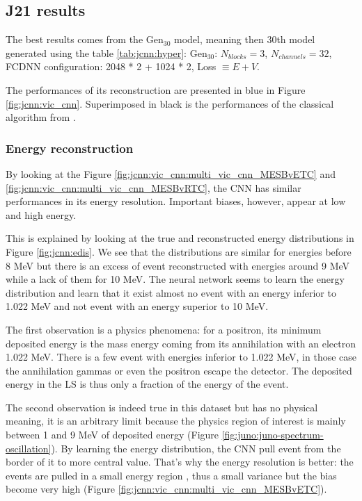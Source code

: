 \documentclass[../main.tex]{subfiles}
\begin{document}
{{\subsection{J21 results}

The best results comes from the $\mathrm{Gen}_{30}$ model, meaning then 30th model generated using the table \ref{tab:jcnn:hyper}: $\mathrm{Gen}_{30}$: $N_{blocks} = 3$, $N_{channels} = 32$, FCDNN configuration: 2048 * 2 + 1024 * 2, Loss $\equiv E+V$.

The performances of its reconstruction are presented in blue in Figure \ref{fig:jcnn:vic_cnn}. Superimposed in black is the performances of the classical algorithm from \cite{lebrin_towards_2022}.

\subsubsection{Energy reconstruction}

By looking at the Figure \ref{fig:jcnn:vic_cnn:multi_vic_cnn_MESBvETC} and \ref{fig:jcnn:vic_cnn:multi_vic_cnn_MESBvRTC}, the CNN has similar performances in its energy resolution. Important biases, however, appear at low and high energy.

This is explained by looking at the true and reconstructed energy distributions in Figure \ref{fig:jcnn:edis}. We see that the distributions are similar for energies before 8 MeV but there is an excess of event reconstructed with energies around 9 MeV while a lack of them for 10 MeV. The neural network seems to learn the energy distribution and learn that it exist almost no event with an energy inferior to 1.022 MeV and not event with an energy superior to 10 MeV.

The first observation is a physics phenomena: for a positron, its minimum deposited energy is the mass energy coming from its annihilation with an electron 1.022 MeV. There is a few event with energies inferior to 1.022 MeV, in those case the annihilation gammas or even the positron escape the detector. The deposited energy in the LS is thus only a fraction of the energy of the event.

The second observation is indeed true in this dataset but has no physical meaning, it is an arbitrary limit because the physics region of interest is mainly between 1 and 9 MeV of deposited energy (Figure \ref{fig:juno:juno-spectrum-oscillation}). By learning the energy distribution, the CNN pull event from the border of it to more central value. That's why the energy resolution is better: the events are pulled in a small energy region , thus a small variance but the bias become very high (Figure \ref{fig:jcnn:vic_cnn:multi_vic_cnn_MESBvETC}).


}}
\end{document}
